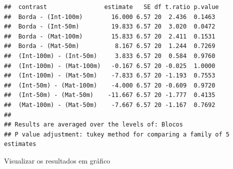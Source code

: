 \documentclass[
]{book}
\begin{document}
\begin{verbatim}
##  contrast                estimate   SE df t.ratio p.value
##  Borda - (Int-100m)        16.000 6.57 20  2.436  0.1463 
##  Borda - (Int-50m)         19.833 6.57 20  3.020  0.0472 
##  Borda - (Mat-100m)        15.833 6.57 20  2.411  0.1531 
##  Borda - (Mat-50m)          8.167 6.57 20  1.244  0.7269 
##  (Int-100m) - (Int-50m)     3.833 6.57 20  0.584  0.9760 
##  (Int-100m) - (Mat-100m)   -0.167 6.57 20 -0.025  1.0000 
##  (Int-100m) - (Mat-50m)    -7.833 6.57 20 -1.193  0.7553 
##  (Int-50m) - (Mat-100m)    -4.000 6.57 20 -0.609  0.9720 
##  (Int-50m) - (Mat-50m)    -11.667 6.57 20 -1.777  0.4135 
##  (Mat-100m) - (Mat-50m)    -7.667 6.57 20 -1.167  0.7692 
## 
## Results are averaged over the levels of: Blocos 
## P value adjustment: tukey method for comparing a family of 5 estimates
\end{verbatim}

Visualizar os resultados em gráfico
\end{document}
